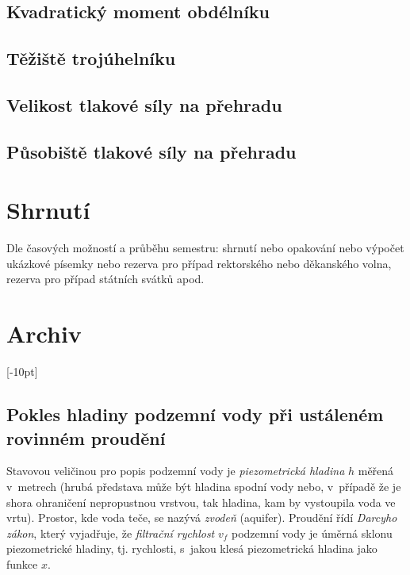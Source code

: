 \subsection{Kvadratický moment obdélníku}

\subsection{Těžiště trojúhelníku}

\subsection{Velikost tlakové síly na přehradu}

\subsection{Působiště tlakové síly na přehradu}

\stranka
\section{Shrnutí}

Dle časových možností a průběhu semestru: shrnutí nebo opakování nebo výpočet ukázkové písemky nebo rezerva pro případ rektorského nebo děkanského volna, rezerva pro případ státních svátků apod.




\stranka


\section{Archiv}

\stranka
{}[-10pt]


\subsection{Pokles hladiny podzemní vody při ustáleném rovinném proudění}

\label{pokles}
Stavovou veličinou pro popis podzemní vody je \textit{piezometrická
  hladina} $h$ měřená v metrech (hrubá představa může být hladina
spodní vody nebo, v případě že je shora ohraničení nepropustnou
vrstvou, tak hladina, kam by vystoupila voda ve vrtu). Prostor, kde
voda teče, se nazývá \textit{zvodeň} (aquifer).
Proudění řídí \textit{Darcyho zákon}, který
  vyjadřuje, že \textit{filtrační rychlost} $v_f$ podzemní vody je úměrná
  sklonu piezometrické hladiny, tj. rychlosti, s jakou klesá
  piezometrická hladina jako funkce $x$.

